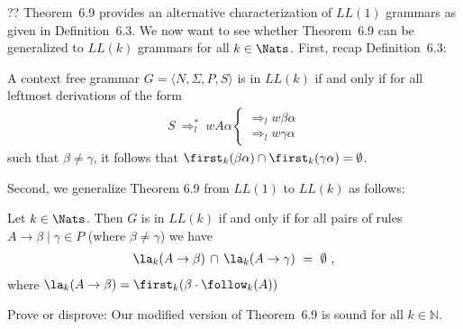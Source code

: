 \begin{exercise}{??}
Theorem~6.9 provides an alternative characterization of $LL(1)$ grammars as given in Definition~6.3. We now want to see whether Theorem~6.9 can be generalized to $LL(k)$ grammars for all $k\in \Nats$. First, recap Definition~6.3:

\begin{mdframed}[linecolor=cyan, linewidth=2pt, topline=false, rightline=false, bottomline=false, skipabove=10pt, skipbelow=10pt]
A context free grammar $G = \langle N, \Sigma, P, S \rangle$ is in $LL(k)$ if and only if for all leftmost derivations of the form
\begin{align*}
    S ~\Rightarrow_{l}^{*}~ wA\alpha \begin{cases}
                                    \Rightarrow_{l} w\beta\alpha \\
                                    \Rightarrow_{l} w\gamma\alpha
                                  \end{cases}
\end{align*}
such that $\beta \neq \gamma$, it follows that $\first_k(\beta\alpha) \cap \first_k(\gamma\alpha) = \emptyset$.
\end{mdframed}

Second, we generalize Theorem 6.9 from $LL(1)$ to $LL(k)$ as follows:

\begin{mdframed}[linecolor=cyan, linewidth=2pt, topline=false, rightline=false, bottomline=false, skipabove=10pt, skipbelow=10pt]
Let $k\in \Nats$. Then $G$ is in $LL(k)$ if and only if for all pairs of rules $A \to \beta \mid \gamma \in P$ (where $\beta \neq \gamma$) we have
\begin{align*}
    \la_k(A \to \beta) \,\cap\, \la_k(A \to \gamma) ~=~ \emptyset~,
\end{align*}
where $\la_k(A \to \beta) = \first_k(\beta \cdot \follow_k(A))$
\end{mdframed}

Prove or disprove: Our modified version of Theorem~6.9 is sound for all $k\in\mathbb{N}$.
\end{exercise}

